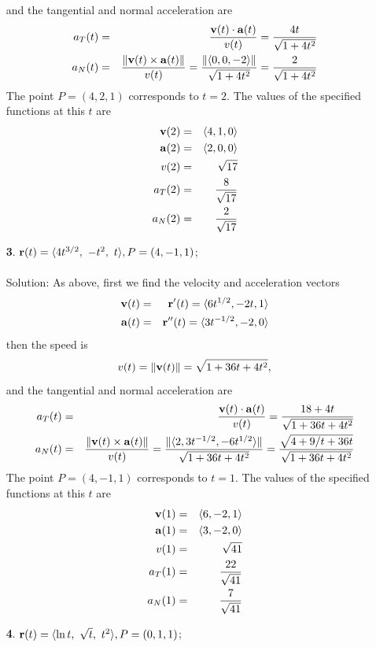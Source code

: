 \documentclass[12pt]{amsbook}
\newcommand{\la}{\langle}
\newcommand{\ra}{\rangle}
\begin{document}
\begin{enumerate}
  and the tangential and normal acceleration are
\begin{eqnarray*}
  a_T(t)&=&\frac{{\bf v}(t)\cdot{\bf a}(t)}{v(t)}=\frac{4t}{\sqrt{1+4t^2}}\\
  a_N(t)&=&\frac{\|{\bf v}(t)\times{\bf a}(t)\|}{v(t)}=\frac{\|\la 0,0,-2 \ra\|}{\sqrt{1+4t^2}}=\frac{2}{\sqrt{1+4t^2}}
\end{eqnarray*}  
The point $P=(4,2,1)$ corresponds to $t=2$. The values of the specified functions at this $t$ are
\begin{eqnarray*}
{\bf v}(2)&=&\la 4,1,0 \ra\\
{\bf a}(2)&=&\la 2,0,0 \ra \\
v(2)&=&\sqrt{17}\\
a_T(2)&=&\frac{8}{\sqrt{17}}\\
a_N(2)&=&\frac{2}{\sqrt{17}}
\end{eqnarray*}
  \item[{\small\bf 3}.] ${\bf r}(t)=\la 4t^{3/2},\ -t^2,\ t\ra, P=(4,-1,1)$;
  \\
  \\
  {\sc Solution}: As above, first we find the velocity and acceleration vectors
  \begin{eqnarray*}
  {\bf v}(t)&=&{\bf r}'(t)=\la 6t^{1/2},-2t,1 \ra\\
  {\bf a}(t)&=&{\bf r}''(t)=\la 3t^{-1/2},-2,0 \ra 
  \end{eqnarray*}
  then the speed is
  $$v(t)=\|{\bf v}(t)\|=\sqrt{1+36t+4t^2},$$
  and the tangential and normal acceleration are
\begin{eqnarray*}
  a_T(t)&=&\frac{{\bf v}(t)\cdot{\bf a}(t)}{v(t)}=\frac{18+4t}{\sqrt{1+36t+4t^2}}\\
  a_N(t)&=&\frac{\|{\bf v}(t)\times{\bf a}(t)\|}{v(t)}=\frac{\|\la 2,3t^{-1/2},-6t^{1/2} \ra\|}{\sqrt{1+36t+4t^2}}=\frac{\sqrt{4+9/t+36t}}{\sqrt{1+36t+4t^2}}
\end{eqnarray*}  
The point $P=(4,-1,1)$ corresponds to $t=1$. The values of the specified functions at this $t$ are
\begin{eqnarray*}
{\bf v}(1)&=&\la 6,-2,1 \ra\\
{\bf a}(1)&=&\la 3,-2,0 \ra \\
v(1)&=&\sqrt{41}\\
a_T(1)&=&\frac{22}{\sqrt{41}}\\
a_N(1)&=&\frac{7}{\sqrt{41}}
\end{eqnarray*}
  \item[{\small\bf 4}.] ${\bf r}(t)=\la \ln t,\ \sqrt{t},\ t^2\ra, P=(0,1,1)$;

\end{enumerate}
\end{document}
